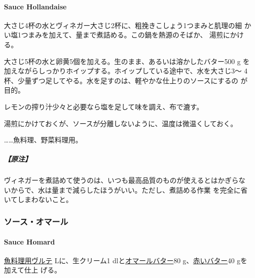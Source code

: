 \begin{recette}
\hypertarget{sauce-hollandaise}{%
\paragraph{Sauce Hollandaise}\label{sauce-hollandaise}}


大さじ4杯の水とヴィネガー大さじ2杯に、粗挽きこしょう1つまみと肌理の細
かい塩1つまみを加えて、\untiers{}量まで煮詰める。この鍋を熱源のそばか、
湯煎にかける。

大さじ5杯の水と卵黄5個を加える。生のまま、あるいは溶かしたバター500 g
を加えながらしっかりホイップする。ホイップしている途中で、水を大さじ3〜
4杯、少量ずつ足してやる。水を足すのは、軽やかな仕上りのソースにするの
が目的。

レモンの搾り汁少々と必要なら塩を足して味を調え、布で漉す。

湯煎にかけておくが、ソースが分離しないように、温度は微温くしておく。

\ldots{}\ldots{}魚料理、野菜料理用。

\hypertarget{ux539fux6ce8-9}{%
\subparagraph{【原注】}\label{ux539fux6ce8-9}}

ヴィネガーを煮詰めて使うのは、いつも最高品質のものが使えるとはかぎらな
いからで、水は\untiers{}量まで減らしたほうがいい。ただし、煮詰める作業
を完全に省いてしまわないこと。

\maeaki

\hypertarget{ux30bdux30fcux30b9ux30aaux30deux30fcux30eb}{%
\subsubsection{ソース・オマール}\label{ux30bdux30fcux30b9ux30aaux30deux30fcux30eb}}

\hypertarget{sauce-homard}{%
\paragraph{Sauce Homard}\label{sauce-homard}}


\protect\hyperlink{veloute-de-poisson}{魚料理用ヴルテ}\troisquarts{}
Lに、生クリーム1 \undemi{} dlと\protect\hyperlink{}{オマールバター}80
g、\protect\hyperlink{}{赤いバター}40 gを加えて仕上 げる。


\end{recette}
